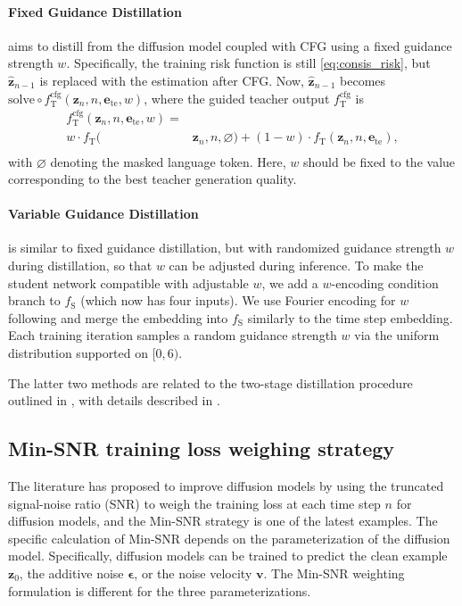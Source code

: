 \documentclass{article}
\newcommand{\et}{\boldsymbol{e}_\mathrm{te}}
\newcommand{\sz}{\boldsymbol{z}}
\newcommand{\shatz}{\boldsymbol{\hat{z}}}
\newcommand{\fstu}{f_{\mathrm{S}}}
\newcommand{\ftea}{f_{\mathrm{T}}}
\newcommand{\ftcfg}{f_{\mathrm{T}}^{\mathrm{cfg}}}
\newcommand{\solve}{\mathrm{solve}}
\begin{document}
\paragraph*{Fixed Guidance Distillation} aims to distill from the diffusion model coupled with CFG using a fixed guidance strength $w$. Specifically, the training risk function is still \cref{eq:consis_risk}, but $\shatz_{n-1}$ is replaced with the estimation after CFG. Now, $\shatz_{n-1}$ becomes $\solve \circ \ftcfg(\sz_n, n, \et, w)$, where the guided teacher output $\ftcfg$ is
\vspace{-1mm}
\begin{align*}
    \ftcfg (\sz_n, n, \et, w) = & \\[-.6mm]
    w \cdot \ftea (& \sz_n, n, \varnothing) + (1-w) \cdot \ftea (\sz_n, n, \et), \\[-5.8mm]
\end{align*}
with $\varnothing$ denoting the masked language token. Here, $w$ should be fixed to the value corresponding to the best teacher generation quality.

\vspace{-11pt}
\paragraph*{Variable Guidance Distillation} is similar to fixed guidance distillation, but with randomized guidance strength $w$ during distillation, so that $w$ can be adjusted during inference. To make the student network compatible with adjustable $w$, we add a $w$-encoding condition branch to $\fstu$ (which now has four inputs). We use Fourier encoding for $w$ following \cite{distillcfg} and merge the embedding into $\fstu$ similarly to the time step embedding. Each training iteration samples a random guidance strength $w$ via the uniform distribution supported on $[0, 6)$.

The latter two methods are related to the two-stage distillation procedure outlined in \cite{distillcfg}, with details described in .


\subsection{Min-SNR training loss weighing strategy}

The literature has proposed to improve diffusion models by using the truncated signal-noise ratio (SNR) to weigh the training loss at each time step $n$ for diffusion models, and the Min-SNR strategy \cite{minsnr} is one of the latest examples. The specific calculation of Min-SNR depends on the parameterization of the diffusion model. Specifically, diffusion models can be trained to predict the clean example $\sz_0$, the additive noise $\boldsymbol{\epsilon}$, or the noise velocity $\boldsymbol{v}$. The Min-SNR weighting formulation is different for the three parameterizations.
\end{document}
